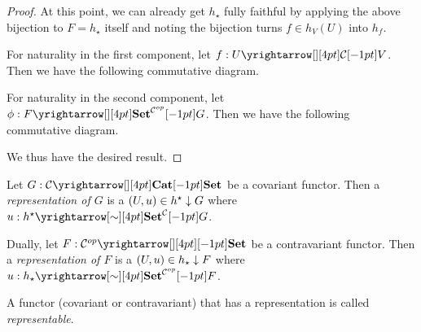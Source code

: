 \begin{proof}
  At this point, we can already get $h_\star$ fully faithful by
  applying the above bijection to $F = h_\star$ itself and noting
  the bijection turns $f \in h_V(U)$ into $h_f$. 

  For naturality in the first component,
  let $f : \map{U}{V}{\CC}{}$.
  Then we have the following commutative diagram. 
  \begin{figure}[H]
    \centering
  \end{figure}
  For naturality in the second component, 
  let $\phi : \map{F}{G}{\SET^{\CC\op}}{}$.
  Then we have the following commutative diagram.
  \begin{figure}[H]
    \centering
  \end{figure}
  We thus have the desired result. 
\end{proof}

\begin{dfn}
  \hypertarget{rep}{}
  
  Let $G : \map{\CC}{\SET}{\CAT}{}$ be a covariant functor. 
  Then a \emph{representation of $G$} is a $(U,u) \in h^\star\downarrow G$
  where $u : \map{h^\star}{G}{\SET^\CC}{\sim}$.

  Dually, let $F : \map{\CC\op}{\SET}{}{}$ be a contravariant functor. 
  Then a \emph{representation of $F$} is a $(U,u) \in h_\star\downarrow F$
  where $u : \map{h_\star}{F}{\SET^{\CC\op}}{\sim}$.

  A functor (covariant or contravariant) that has a representation is called 
  \emph{representable}.
\end{dfn}

